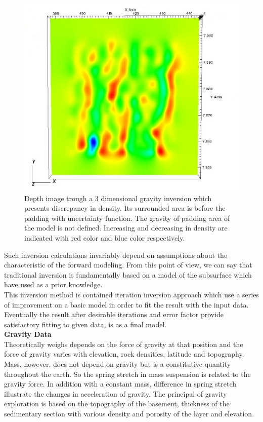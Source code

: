 \begin{figure}
\centering
\includegraphics[width=\textwidth]{pasted1.png}
\caption{Depth image trough a 3 dimensional gravity inversion which presents discrepancy in density. Its surrounded area is before the padding with uncertainty function. The gravity of padding area of the
model is not defined. Increasing and decreasing in density are indicated
with red color and blue color respectively.}
\end{figure}

Such inversion calculations invariably depend on assumptions about the characteristic of the forward modeling. From this point of view, we can say that traditional inversion is fundamentally based on a model of the subsurface which have used as a prior knowledge.\\
This inversion method is contained iteration inversion approach which use a series of improvement on a basic model in order to fit the result with the input data. Eventually the result after desirable iterations and error factor provide  satisfactory fitting to given data, is as a final model.\\


\textbf{Gravity Data} \\

Theoretically weighs depends on the force of gravity at that position and the force of gravity varies with elevation, rock densities, latitude and topography. Mass, however, does not depend on gravity but is a constitutive quantity throughout the earth. So the spring stretch in mass suspension is related to the gravity force. In addition with a constant mass, difference in spring stretch illustrate the changes in acceleration of gravity. The principal of gravity exploration is based on the topography of the basement, thickness of the sedimentary section with various density and porosity of the layer and elevation.\\

